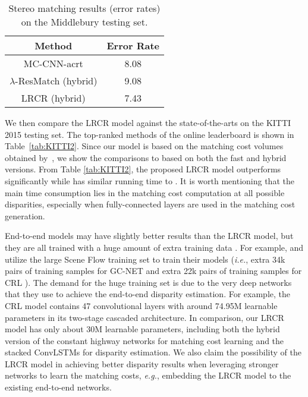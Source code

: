 \documentclass[10pt,twocolumn,letterpaper]{article}
\begin{document}
 \begin{table}
  	\small
 	\setlength{\tabcolsep}{2.5pt}
 	\renewcommand{\arraystretch}{1}
 	\centering
 	\caption{\small Stereo matching results (error rates) on the Middlebury testing set.}
 	\vspace{-0.5cm}
 	\begin{tabular}{|c|c|}
 		\hline
 		Method & Error Rate  \\
 		\hline
 		MC-CNN-acrt\cite{zbontar2015computing} & 8.08 \\
 		$\lambda$-ResMatch (hybrid)\cite{shaked2016improved} & 9.08 \\
 		LRCR (hybrid) & 7.43 \\
 		\hline
 	\end{tabular}
 	\label{tab:Middle}%
 	\vspace{-0.4cm}
 \end{table}

 We then compare the LRCR model against the state-of-the-arts  on the KITTI 2015 testing set. The top-ranked methods of the online leaderboard is shown in Table~\ref{tab:KITTI2}. Since our model is based on the matching cost volumes obtained by~\cite{shaked2016improved}, we show the comparisons to \cite{shaked2016improved} based on both the fast and hybrid versions. From Table \ref{tab:KITTI2}, the proposed LRCR model outperforms \cite{shaked2016improved} significantly while has similar running time to \cite{shaked2016improved}. It is worth mentioning that the main time consumption lies in the matching cost computation at all possible disparities, especially when fully-connected layers are used in the matching cost generation. 
 
 End-to-end models may have slightly better results than the LRCR model, but they are all trained with a huge amount of extra training data \cite{mayer2016large}. For example, \cite{kendall2017end} and \cite{pang2017cascade} utilize the large Scene Flow training set to train their models (\emph{i.e.}, extra 34k pairs of training samples for GC-NET \cite{kendall2017end} and extra 22k pairs of training samples for CRL \cite{pang2017cascade}). The demand for the huge training set is due to the very deep networks that they use to achieve the end-to-end disparity estimation. For example, the CRL model \cite{pang2017cascade} contains 47 convolutional layers with around 74.95M learnable parameters in its two-stage cascaded architecture. In comparison, our LRCR model has only about 30M learnable parameters, including both the hybrid version of the constant highway networks for  matching cost learning and the stacked ConvLSTMs for disparity estimation. We also claim the possibility of the LRCR model in achieving better disparity results when leveraging stronger networks to learn the matching costs, \emph{e.g.}, embedding the LRCR model to the existing end-to-end networks.
 
\end{document}
